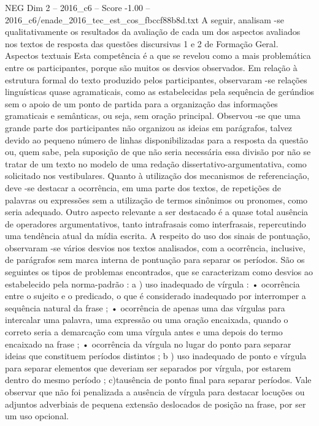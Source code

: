 \begin{textsample}{NEG Dim 2 – 2016\_c6 – Score -1.00 – 2016\_c6/enade\_2016\_tec\_est\_cos\_fbccf88b8d.txt}
A seguir, analisam -se qualitativamente os resultados da avaliação de cada um dos aspectos avaliados nos textos de resposta das questões discursivas 1 e 2 de Formação Geral.
Aspectos textuais Esta competência é a que se revelou como a mais problemática entre os participantes, porque são muitos os desvios observados.
Em relação à estrutura formal do texto produzido pelos participantes, observaram -se relações linguísticas quase agramaticais, como as estabelecidas pela sequência de gerúndios sem o apoio de um ponto de partida para a organização das informações gramaticais e semânticas, ou seja, sem oração principal.
Observou -se que uma grande parte dos participantes não organizou as ideias em parágrafos, talvez devido ao pequeno número de linhas disponibilizadas para a resposta da questão ou, quem sabe, pela suposição de que não seria necessária essa divisão por não se tratar de um texto no modelo de uma redação dissertativo-argumentativa, como solicitado nos vestibulares.
Quanto à utilização dos mecanismos de referenciação, deve -se destacar a ocorrência, em uma parte dos textos, de repetições de palavras ou expressões sem a utilização de termos sinônimos ou pronomes, como seria adequado.
Outro aspecto relevante a ser destacado é a quase total ausência de operadores argumentativos, tanto intrafrasais como interfrasais, repercutindo uma tendência atual da mídia escrita.
A respeito do uso dos sinais de pontuação, observaram -se vários desvios nos textos analisados, com a ocorrência, inclusive, de parágrafos sem marca interna de pontuação para separar os períodos.
São os seguintes os tipos de problemas encontrados, que se caracterizam como desvios ao estabelecido pela norma-padrão : a ) uso inadequado de vírgula : • ocorrência entre o sujeito e o predicado, o que é considerado inadequado por interromper a sequência natural da frase ; • ocorrência de apenas uma das vírgulas para intercalar uma palavra, uma expressão ou uma oração encaixada, quando o correto seria a demarcação com uma vírgula antes e uma depois do termo encaixado na frase ; • ocorrência da vírgula no lugar do ponto para separar ideias que constituem períodos distintos ; b ) uso inadequado de ponto e vírgula para separar elementos que deveriam ser separados por vírgula, por estarem dentro do mesmo período ; c)tausência de ponto final para separar períodos.
Vale observar que não foi penalizada a ausência de vírgula para destacar locuções ou adjuntos adverbiais de pequena extensão deslocados de posição na frase, por ser um uso opcional.

\end{textsample}
